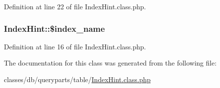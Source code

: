 Definition at line 22 of file Index\-Hint.\-class.\-php.

\hypertarget{classIndexHint_a72e2ec1c8ae97c974642bf4342febc60}{
\subsubsection[{\$index\-\_\-name}]{\setlength{\rightskip}{0pt plus 5cm}Index\-Hint\-::\$index\-\_\-name}}\label{classIndexHint_a72e2ec1c8ae97c974642bf4342febc60}


Definition at line 16 of file Index\-Hint.\-class.\-php.



The documentation for this class was generated from the following file\-:\begin{DoxyCompactItemize}
\item 
classes/db/queryparts/table/\hyperlink{IndexHint_8class_8php}{Index\-Hint.\-class.\-php}\end{DoxyCompactItemize}
